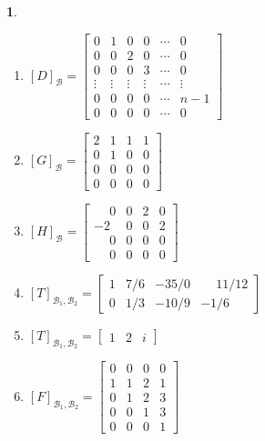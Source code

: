 \documentclass[12pt]{exam}
\newtheorem{exercicio}{}
\begin{document}
\begin{exercicio}
\begin{solucao}
\begin{enumerate}[label=({\alph*})]
        \item $[D]_\mathcal{B} = \begin{bmatrix}
          0 & 1 & 0 & 0 & \cdots & 0\\
          0 & 0 & 2 & 0 & \cdots & 0\\
          0 & 0 & 0 & 3 & \cdots & 0\\
          \vdots & \vdots & \vdots & \vdots & \cdots & \vdots\\
          0 & 0 & 0 & 0 & \cdots & n - 1\\
          0 & 0 & 0 & 0 & \cdots & 0
        \end{bmatrix}$

        \item $[G]_\mathcal{B} = \begin{bmatrix}
          2 & 1 & 1 & 1\\
          0 & 1 & 0 & 0\\
          0 & 0 & 0 & 0\\
          0 & 0 & 0 & 0
        \end{bmatrix}$

        \item $[H]_\mathcal{B} = \begin{bmatrix}
          \phantom{-}0 & 0 & 2 & 0\\
          -2 & 0 & 0 & 2\\
          \phantom{-}0 & 0 & 0 & 0\\
          \phantom{-}0 & 0 & 0 & 0
        \end{bmatrix}$

        \item $[T]_{\mathcal{B}_1, \mathcal{B}_2} = \begin{bmatrix}
          1 & 7/6 & -35/0 & \phantom{-}11/12\\
          0 & 1/3 & -10/9 & -1/6
        \end{bmatrix}$

        \item $[T]_{\mathcal{B}_1, \mathcal{B}_2} = \begin{bmatrix}
          1 & 2 & i
        \end{bmatrix}$

        \item $[F]_{\mathcal{B}_1, \mathcal{B}_2} = \begin{bmatrix}
          0 & 0 & 0 & 0\\
          1 & 1 & 2 & 1\\
          0 & 1 & 2 & 3\\
          0 & 0 & 1 & 3\\
          0 & 0 & 0 & 1
        \end{bmatrix}$


\end{enumerate}
\end{solucao}
\end{exercicio}
\end{document}
